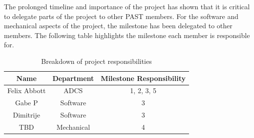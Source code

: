 The prolonged timeline and importance of the project has shown that it is critical to delegate parts of the project to other PAST members.
For the software and mechanical aspects of the project, the milestone has been delegated to other members. The following table highlights the milestone each member is responsible for.
\begin{table}[H]
\centering
\begin{tabular}{|c|c|c|}
\hline
\textbf{Name} & \textbf{Department} & \textbf{Milestone Responsibility} \\
\hline
Felix Abbott & ADCS & 1, 2, 3, 5 \\
\hline
Gabe P & Software & 3 \\
\hline
Dimitrije & Software & 3 \\
\hline
TBD & Mechanical & 4 \\
\hline
\end{tabular}
\caption{Breakdown of project responsibilities}
\label{tab:responsibilities}
\end{table}